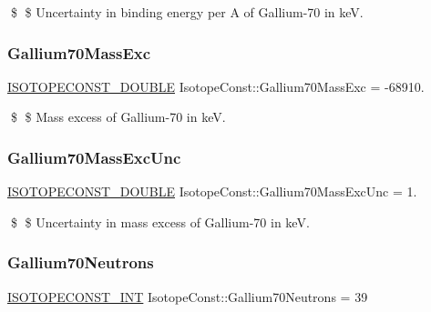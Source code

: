 \$ \$ Uncertainty in binding energy per A of Gallium-\/70 in keV. \mbox{\label{group___isotope_const-_gallium-_ga70_ga3569293b0796351171ec723776645423}} 
\subsubsection{\texorpdfstring{Gallium70\+Mass\+Exc}{Gallium70MassExc}}
{\footnotesize\ttfamily \mbox{\hyperlink{group___isotope_const-_macros_ga8f45a7272ce02c0b4c65c44636ed719a}{I\+S\+O\+T\+O\+P\+E\+C\+O\+N\+S\+T\+\_\+\+D\+O\+U\+B\+LE}} Isotope\+Const\+::\+Gallium70\+Mass\+Exc = -\/68910.}

\$ \$ Mass excess of Gallium-\/70 in keV. \mbox{\label{group___isotope_const-_gallium-_ga70_ga36ab02fb8d5dfd2e44fdacc0c4b4857b}} 
\subsubsection{\texorpdfstring{Gallium70\+Mass\+Exc\+Unc}{Gallium70MassExcUnc}}
{\footnotesize\ttfamily \mbox{\hyperlink{group___isotope_const-_macros_ga8f45a7272ce02c0b4c65c44636ed719a}{I\+S\+O\+T\+O\+P\+E\+C\+O\+N\+S\+T\+\_\+\+D\+O\+U\+B\+LE}} Isotope\+Const\+::\+Gallium70\+Mass\+Exc\+Unc = 1.}

\$ \$ Uncertainty in mass excess of Gallium-\/70 in keV. \mbox{\label{group___isotope_const-_gallium-_ga70_gad91bc9a822f7b3863e5e81c292bcfd30}} 
\subsubsection{\texorpdfstring{Gallium70\+Neutrons}{Gallium70Neutrons}}
{\footnotesize\ttfamily \mbox{\hyperlink{group___isotope_const-_macros_ga5f18360b3e99483a35c32d789e62621c}{I\+S\+O\+T\+O\+P\+E\+C\+O\+N\+S\+T\+\_\+\+I\+NT}} Isotope\+Const\+::\+Gallium70\+Neutrons = 39}

